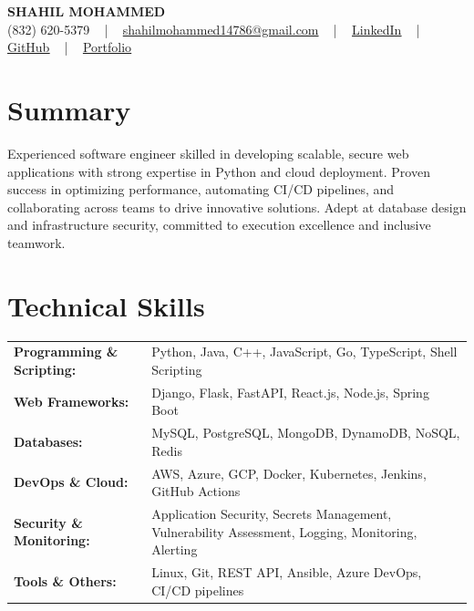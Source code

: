 \documentclass[letterpaper,11pt]{article}
\begin{document}
\begin{center}
    {\fontsize{14pt}{12pt}\selectfont \textbf{\MakeUppercase{Shahil Mohammed}}}\\ \vspace{2pt}
    \fontsize{10pt}{12pt}\selectfont (832) 620-5379 ~ | ~ \href{mailto:shahilmohammed14786@gmail.com}{shahilmohammed14786@gmail.com} ~ | ~  
    \href{https://www.linkedin.com/in/shahil-mohammed-9652931a1/}{\color{blue}\underline{LinkedIn}}  ~ | ~ 
    \href{https://github.com/freakbeast14}{\color{blue}\underline{GitHub}} ~ | ~ 
    \href{https://shahil-mohammed.netlify.app/}{\color{blue}\underline{Portfolio}}
    \vspace{-8pt}
\end{center}

\section{Summary}
\fontsize{9pt}{10pt}\selectfont
Experienced software engineer skilled in developing scalable, secure web applications with strong expertise in Python and cloud deployment. Proven success in optimizing performance, automating CI/CD pipelines, and collaborating across teams to drive innovative solutions. Adept at database design and infrastructure security, committed to execution excellence and inclusive teamwork.
 \vspace{-5pt}
 
\section{Technical Skills}
        \vspace{-14pt}
        \begin{table}[h]
            \fontsize{9pt}{10pt}\selectfont
            \begin{tabular}{p{0.3\linewidth} p{0.7\linewidth}}
                \textbf{Programming \& Scripting:} & Python, Java, C++, JavaScript, Go, TypeScript, Shell Scripting \\
                \textbf{Web Frameworks:} & Django, Flask, FastAPI, React.js, Node.js, Spring Boot \\
                \textbf{Databases:} & MySQL, PostgreSQL, MongoDB, DynamoDB, NoSQL, Redis \\
                \textbf{DevOps \& Cloud:} & AWS, Azure, GCP, Docker, Kubernetes, Jenkins, GitHub Actions \\
                \textbf{Security \& Monitoring:} & Application Security, Secrets Management, Vulnerability Assessment, Logging, Monitoring, Alerting \\
                \textbf{Tools \& Others:} & Linux, Git, REST API, Ansible, Azure DevOps, CI/CD pipelines \\
            \end{tabular}
        \end{table}
 \vspace{-15pt}
 
\end{document}
